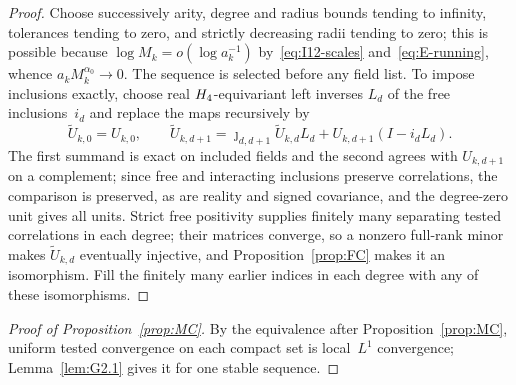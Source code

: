 \begin{proof}
Choose successively arity, degree and radius bounds tending to infinity, tolerances tending to zero, and strictly decreasing radii tending to zero; this is possible because $\log M_k=o(\log a_k^{-1})$ by~\eqref{eq:I12-scales} and~\eqref{eq:E-running}, whence $a_kM_k^{\alpha_0}\to0$. The sequence is selected before any field list. To impose inclusions exactly, choose real $H_4$-equivariant left inverses $L_d$ of the free inclusions~$i_d$ and replace the maps recursively by
\begin{equation}\label{eq:G-correct-frames}
\widetilde U_{k,0}=U_{k,0},\qquad
\widetilde U_{k,d+1}=\jmath_{d,d+1}\widetilde U_{k,d}L_d
 +U_{k,d+1}(I-i_dL_d).
\end{equation}
The first summand is exact on included fields and the second agrees with $U_{k,d+1}$ on a complement; since free and interacting inclusions preserve correlations, the comparison is preserved, as are reality and signed covariance, and the degree-zero unit gives all units. Strict free positivity supplies finitely many separating tested correlations in each degree; their matrices converge, so a nonzero full-rank minor makes $\widetilde U_{k,d}$ eventually injective, and Proposition~\ref{prop:FC} makes it an isomorphism. Fill the finitely many earlier indices in each degree with any of these isomorphisms.
\end{proof}
\begin{proof}[Proof of Proposition~\ref{prop:MC}]
By the equivalence after Proposition~\ref{prop:MC}, uniform tested convergence on each compact set is local~$L^1$ convergence; Lemma~\ref{lem:G2.1} gives it for one stable sequence.
\end{proof}

